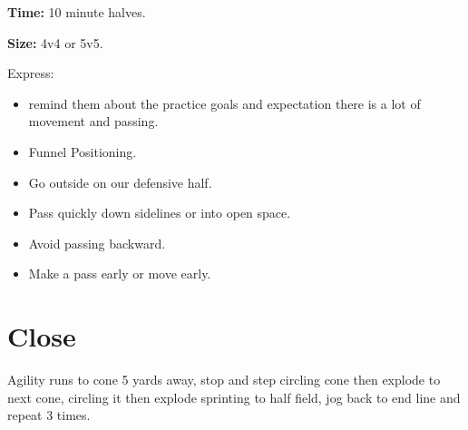 \documentclass[10pt,letterpaper]{article}
\newenvironment{oddBlock}[1]{%
    \tcolorbox[beamer,%
    noparskip,breakable,
    colback=LightBlue,colframe=DarkBlue,%
    colbacklower=DarkBlue!75!LightBlue,%
    title=#1]}%
    {\endtcolorbox}
\begin{document}
\begin{oddBlock}{Small Sided}
    \textbf{Time:} 10 minute halves.

    \textbf{Size:} 4v4 or 5v5.

    Express:
    \begin{itemize}
        \setlength{\itemsep}{0pt}
        \setlength{\parskip}{0pt}
        \setlength{\parsep}{0pt}
        \item  remind them about the practice goals and expectation there is a lot of movement and passing.
        \item Funnel Positioning.
        \item Go outside on our defensive half.
        \item Pass quickly down sidelines or into open space.
        \item Avoid passing backward.
        \item Make a pass early or move early.
    \end{itemize}

\end{oddBlock}

\section{Close}
\begin{oddBlock}{Sprints (5 min)}
    Agility runs to cone 5 yards away, stop and step circling cone then explode to next cone, circling it then explode sprinting to half field, jog back to end line and repeat 3 times.
\end{oddBlock}
\end{document}
